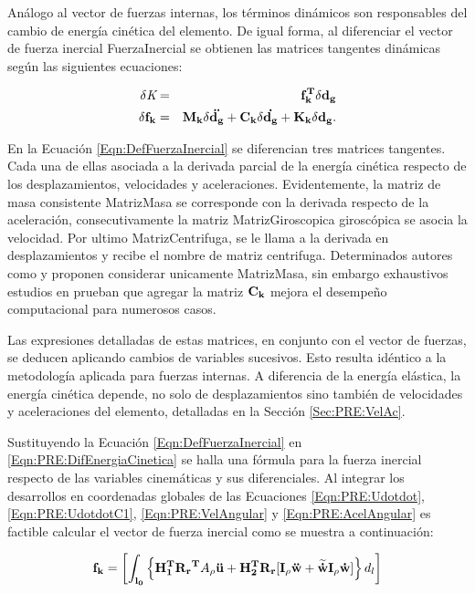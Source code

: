 Análogo al vector de fuerzas internas, los términos dinámicos son responsables del cambio de energía cinética del elemento. De igual forma, al diferenciar el vector de fuerza inercial \gls{FuerzaInercial} se obtienen las matrices tangentes dinámicas según las siguientes ecuaciones:

\begin{eqnarray}
		\label{Eqn:PRE:defFuerzaInercial}
	\delta\textit{K}&=&\bf{f_k^T}\delta\bf{d}_g\\
	\label{Eqn:DefFuerzaInercial}
	\delta\bf{f_k}&=& \bf{M}_k\delta \ddot{\bf{d_g}}+\bf{C}_k\delta
	\dot{\bf{d_g}}+\bf{K}_k\delta{\bf{d_g}}.
\end{eqnarray}


En la Ecuación \ref{Eqn:DefFuerzaInercial} se diferencian tres matrices tangentes. Cada una de ellas asociada a la derivada parcial de la energía cinética respecto de los desplazamientos, velocidades y aceleraciones. Evidentemente, la matriz de masa consistente \gls{MatrizMasa} se corresponde con la derivada respecto de la aceleración, consecutivamente la matriz \gls{MatrizGiroscopica} giroscópica se asocia la velocidad. Por ultimo \gls{MatrizCentrifuga}, se le llama a la derivada en desplazamientos y recibe el nombre de matriz centrifuga. Determinados autores como \cite{cardona1988beam} y \cite{hsiao1999consistent} proponen considerar unicamente \gls{MatrizMasa}, sin embargo exhaustivos estudios en \citep{hsiao1999consistent} prueban que agregar la matriz $\bf{C_k}$ mejora el desempeño computacional para numerosos casos.

Las expresiones detalladas de estas matrices, en conjunto con el vector de fuerzas, se deducen aplicando cambios de variables sucesivos. Esto resulta idéntico a la metodología aplicada para fuerzas internas. A diferencia de la energía elástica, la energía cinética depende, no solo de desplazamientos sino también de velocidades y aceleraciones del elemento, detalladas en la Sección \ref{Sec:PRE:VelAc}.

Sustituyendo la Ecuación \eqref{Eqn:DefFuerzaInercial} en \eqref{Eqn:PRE:DifEnergiaCinetica} se halla una fórmula para la fuerza inercial respecto de las variables cinemáticas y sus diferenciales. Al integrar los desarrollos en coordenadas globales de las Ecuaciones \eqref{Eqn:PRE:Udotdot}, \eqref{Eqn:PRE:UdotdotC1}, \eqref{Eqn:PRE:VelAngular} y \eqref{Eqn:PRE:AcelAngular}  es factible calcular el vector de fuerza inercial como se muestra a continuación:

\begin{equation}\label{Eqn:PRE:FuerzaInercial}
\bf{f}_k=\left [ \int _{l_0} \left \{ \bf{H}_1^T\bf{R_r}^T \text{$A_\rho$}\ddot{\bf{u}} +\bf{H}_2^T \bf{R_r} [\bf{I}_\rho\ddot{\bf{w}}+\widetilde{\dot{\bf{w}}}\bf{I}_\rho\dot{w}] \right \} \text{$d_l$} \right  ]
\end{equation}

